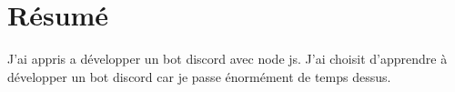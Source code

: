 \section{Résumé}
J'ai appris a développer un bot discord avec node js. J'ai choisit d'apprendre à développer un bot discord car je passe énormément de temps dessus.